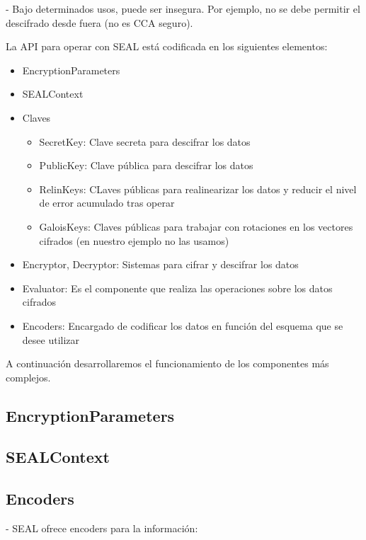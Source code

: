 - Bajo determinados usos, puede ser insegura. Por ejemplo, no se debe permitir el descifrado desde fuera \cite{peng_danger_2019} (no es CCA seguro).


La API para operar con SEAL está codificada en los siguientes elementos:

\begin{itemize}
  \item EncryptionParameters
  \item SEALContext
  \item Claves
  \begin{itemize}
    \item SecretKey: Clave secreta para descifrar los datos
    \item PublicKey: Clave pública para descifrar los datos
    \item RelinKeys: CLaves públicas para realinearizar los datos y reducir el nivel de error acumulado tras operar
    \item GaloisKeys: Claves públicas para trabajar con rotaciones en los vectores cifrados (en nuestro ejemplo no las usamos)
  \end{itemize}
  \item Encryptor, Decryptor: Sistemas para cifrar y descifrar los datos
  \item Evaluator: Es el componente que realiza las operaciones sobre los datos cifrados
  \item Encoders: Encargado de codificar los datos en función del esquema que se desee utilizar
\end{itemize}

A continuación desarrollaremos el funcionamiento de los componentes más complejos.

\subsection{EncryptionParameters}



\subsection{SEALContext}



\subsection{Encoders}

- SEAL ofrece encoders para la información:

